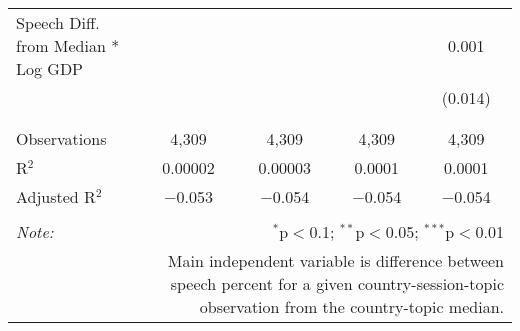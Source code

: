 \begin{table}[!htbp]
\begin{tabular}{@{\extracolsep{5pt}}lcccc}
 Speech Diff. from Median * Log GDP &  &  &  & 0.001 \\ 
  &  &  &  & (0.014) \\ 
  & & & & \\ 
\hline \\[-1.8ex] 
Observations & 4,309 & 4,309 & 4,309 & 4,309 \\ 
R$^{2}$ & 0.00002 & 0.00003 & 0.0001 & 0.0001 \\ 
Adjusted R$^{2}$ & $-$0.053 & $-$0.054 & $-$0.054 & $-$0.054 \\ 
\hline 
\hline \\[-1.8ex] 
\textit{Note:}  & \multicolumn{4}{r}{$^{*}$p$<$0.1; $^{**}$p$<$0.05; $^{***}$p$<$0.01} \\ 
 & \multicolumn{4}{r}{Main independent variable is difference between speech percent for a given country-session-topic observation from the country-topic median.} \\ 
\end{tabular} 
\end{table} 
